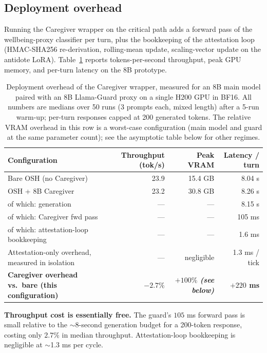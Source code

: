 \documentclass[10pt,letterpaper]{article}
\theoremstyle{definition}
\theoremstyle{plain}
\newcommand{\osh}{\textsc{OSH}}
\begin{document}
\subsection{Deployment overhead}
\label{sec:overhead}

Running the Caregiver wrapper on the critical path adds a forward pass
of the wellbeing-proxy classifier per turn, plus the bookkeeping of the
attestation loop (HMAC-SHA256 re-derivation, rolling-mean update,
scaling-vector update on the antidote LoRA). Table~\ref{tab:overhead}
reports tokens-per-second throughput, peak GPU memory, and per-turn
latency on the 8B prototype.

\begin{table}[t]
\centering
\caption{Deployment overhead of the Caregiver wrapper, measured for an
8B main model paired with an 8B Llama-Guard proxy on a single H200 GPU
in BF16. All numbers are medians over 50 runs (3 prompts each, mixed
length) after a 5-run warm-up; per-turn responses capped at 200
generated tokens. The relative VRAM overhead in this row is a
worst-case configuration (main model and guard at the same parameter
count); see the asymptotic table below for other regimes.}
\label{tab:overhead}
\begin{tabular}{lrrr}
\toprule
\textbf{Configuration} & \textbf{Throughput (tok/s)} & \textbf{Peak VRAM} & \textbf{Latency / turn} \\
\midrule
Bare \osh{} (no Caregiver) & 23.9 & 15.4 GB & 8.04 s \\
\osh{} + 8B Caregiver & 23.2 & 30.8 GB & 8.26 s \\
\quad of which: generation & --- & --- & 8.15 s \\
\quad of which: Caregiver fwd pass & --- & --- & 105 ms \\
\quad of which: attestation-loop bookkeeping & --- & --- & 1.6 ms \\
Attestation-only overhead, measured in isolation & --- & negligible & 1.3 ms / tick \\
\midrule
\textbf{Caregiver overhead vs.\ bare (this configuration)} & \textbf{$-2.7\%$} & \textbf{$+100\%$ \emph{(see below)}} & \textbf{$+220$ ms} \\
\bottomrule
\end{tabular}
\end{table}

\textbf{Throughput cost is essentially free.} The guard's $105$ ms
forward pass is small relative to the $\sim$8-second generation budget
for a 200-token response, costing only $2.7\%$ in median throughput.
Attestation-loop bookkeeping is negligible at $\sim$1.3 ms per cycle.
\end{document}
